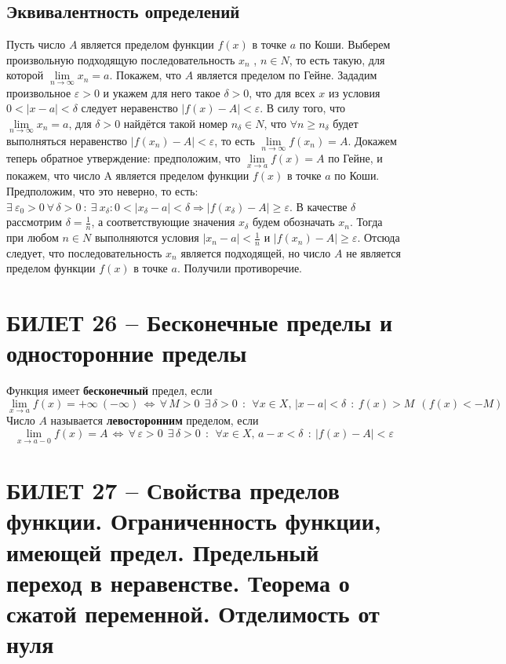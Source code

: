 \documentclass{article}
\begin{document}
\subsection{Эквивалентность определений}
Пусть число $A$ является пределом функции $f(x)$ в точке $a$ по Коши. Выберем произвольную подходящую последовательность $x_n$ , $n \in N$, то есть такую, для которой $\lim\limits_{n\rightarrow \infty } x_n = a$. Покажем, что $A$ является пределом по Гейне.
\newline
Зададим произвольное $\varepsilon > 0$ и укажем для него такое $\delta > 0$, что для всех $x$ из условия $0 < |x-a| < \delta$ следует неравенство $|f(x)-A | < \varepsilon$. В силу того, что $\lim\limits_{n\rightarrow \infty } x_n = a$, для $\delta > 0$ найдётся такой номер $n_{\delta }\in N$, что $\forall n\geqslant n_{\delta }$ будет выполняться неравенство $|f(x_{n})-A| < \varepsilon$, то есть $\lim\limits_{n\rightarrow \infty } f(x_{n}) = A$.
\newline
Докажем теперь обратное утверждение: предположим, что $\lim\limits_{x\rightarrow a } f(x) = A$ по Гейне, и покажем, что число A является пределом функции $f(x)$ в точке $a$ по Коши. Предположим, что это неверно, то есть: $\exists\: \varepsilon_{0} > 0\: \forall\, \delta > 0 \::\:\exists\: x_{\delta }:0<|x_{\delta }-a|<\delta \Rightarrow |f(x_{\delta })-A|\geqslant \varepsilon$. В качестве $\delta$ рассмотрим $\delta = \frac{1}{n}$, а соответствующие значения $x_{\delta }$ будем обозначать $x_{n}$. Тогда при любом $n\in N$ выполняются условия $|x_{n}-a|<\frac{1}{n}$ и $|f(x_{n})- A | \geqslant \varepsilon$. Отсюда следует, что последовательность $x_{n}$ является подходящей, но число $A$ не является пределом функции $f(x)$ в точке $a$. Получили противоречие.
\newpage
\section{БИЛЕТ 26 -- Бесконечные пределы и односторонние пределы}
Функция имеет \textbf{бесконечный} предел, если
$$ \lim_{x\to a} f(x) = + \infty\: (-\infty)\, \Leftrightarrow \, \forall\, M>0\:\:\exists\,\delta >0\:\::\:\:\forall x\in X, \,|x-a|<\delta\:\:: \: f(x)>M\:\:(f(x)<-M)$$
Число $A$ называется \textbf{левосторонним} пределом, если
$$ \lim_{x\to a-0} f(x)=A\,\Leftrightarrow\,\forall\,\varepsilon>0\:\: \exists\,\delta >0\:\: :\:\:\forall x \in X,\, a-x<\delta\:\: :\: |f(x)-A|<\varepsilon$$
\newpage
\section{БИЛЕТ 27 -- Свойства пределов функции. Ограниченность функции, имеющей предел. Предельный переход в неравенстве. Теорема о сжатой переменной. Отделимость от нуля}
\end{document}
